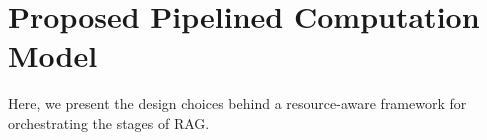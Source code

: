 \section{Proposed Pipelined Computation Model}
\label{sec:04Design}


Here, we present the design choices behind a resource-aware framework for orchestrating the stages of RAG.







